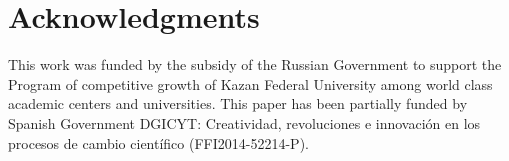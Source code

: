 \documentclass[oribibl]{llncs}
\begin{document}
\section{Acknowledgments}
\label{sect:acknowledgments}
This work was funded by the subsidy of the Russian Government to support the Program of competitive growth of Kazan Federal University among world class academic centers and universities. This paper has been partially funded by Spanish Government DGICYT: Creatividad, revoluciones e innovación en los procesos de cambio científico (FFI2014-52214-P).




\end{document}
